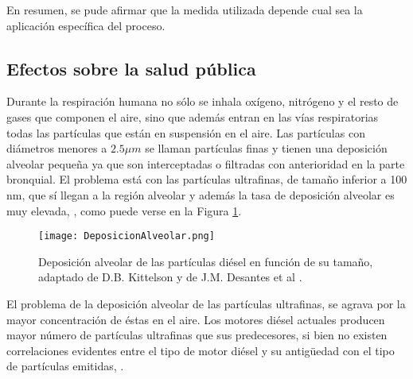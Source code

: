 \par En resumen, se pude afirmar que la medida utilizada depende cual sea la aplicación específica del proceso. 

\subsection{Efectos sobre la salud pública}

\par Durante la respiración humana no sólo se inhala oxígeno, nitrógeno y el resto de gases que componen el aire, sino que además entran en las vías respiratorias todas las partículas que están en suspensión en el aire. Las partículas con diámetros menores a $2.5 \mu m$ se llaman partículas finas y tienen una deposición alveolar pequeña ya que son interceptadas o filtradas con anterioridad en la parte bronquial. El problema está con las partículas ultrafinas, de tamaño inferior a 100 nm, que sí llegan a la región alveolar y además la tasa de deposición alveolar es muy elevada, \cite{leeetal:2003}, como puede verse en la Figura \ref{fig:deposicionalveolar}.

\begin{figure}[ht]
\centering
	\texttt{[image: DeposicionAlveolar.png]}	 
	\caption{Deposición alveolar de las partículas diésel en función de su tamaño, adaptado de D.B. Kittelson \cite{kittelson:1998} y de J.M. Desantes et al \cite{desantesetal:2005}.} \label{fig:deposicionalveolar}
\end{figure} 

\par El problema de la deposición alveolar de las partículas ultrafinas, se agrava por la mayor concentración de éstas en el aire. Los motores diésel actuales producen mayor número de partículas ultrafinas que sus predecesores, si bien no existen correlaciones evidentes entre el tipo de motor diésel y su antigüedad con el tipo de partículas emitidas, \cite{morawskaetal:1998}.

